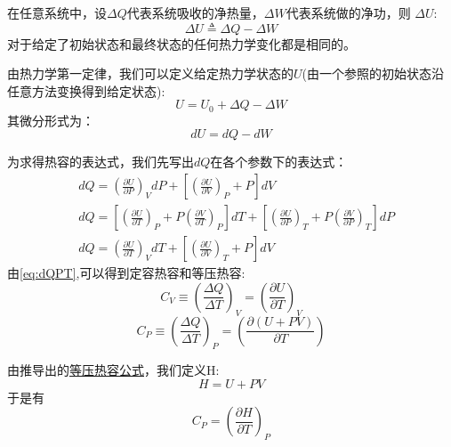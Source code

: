 \documentclass[12pt, a4paper, oneside]{ctexbook}
\newcommand{\hl}[1]{\hlbox{#1}}
\newcommand{\optxt}[1]{\textcolor{opcol}{#1}}
\newcommand{\tit}[1]{\begin{center}
          \large\hl{#1}
        \end{center}}
\newcounter{#2}
\newcounter{#2}[#1]
\numberwithin{#2}{#1}
\begin{document}
          \begin{law}
            \tit{热力学第一定律}
            在任意系统中，设$\Delta Q$代表系统吸收的净热量，\(\Delta W\)代表系统做的净功，则 \(\Delta U\):
            \begin{equation}
              \Delta U\triangleq \Delta Q-\Delta W
            \end{equation}
            对于给定了初始状态和最终状态的任何热力学变化都是相同的。
          \end{law}
          \begin{define}
            由热力学第一定律，我们可以定义给定热力学状态的\hl{内能}\(U\)(\optxt{由一个参照的初始状态沿任意方法变换得到给定状态}):
            \begin{equation*}
              U=U_0+\Delta Q-\Delta W
            \end{equation*}
            其\optxt{微分形式}为：
            \begin{equation}
              dU=dQ-dW
            \end{equation}
          \end{define}
          \begin{deduce}
            \label{ded:dQ}
            为求得热容的表达式，我们先写出\(dQ\)在各个参数下的表达式：
            \begin{align}
              \label{eq:dQPV}&d Q=\left(\frac{\partial U}{\partial P}\right)_V d P+\left[\left(\frac{\partial U}{\partial V}\right)_P+P\right] d V \\
              \label{eq:dQPT}&d Q=\left[\left(\frac{\partial U}{\partial T}\right)_P+P\left(\frac{\partial V}{\partial T}\right)_P\right] d T+\left[\left(\frac{\partial U}{\partial P}\right)_T+P\left(\frac{\partial V}{\partial P}\right)_T\right] d P \\
              \label{eq:dQVT}&d Q=\left(\frac{\partial U}{\partial T}\right)_V d T+\left[\left(\frac{\partial U}{\partial V}\right)_T+P\right] d V
              \end{align}
              由\autoref{eq:dQPT},可以得到定容热容和等压热容:
              \begin{equation}
                C_V\equiv \left(\frac{\Delta Q}{\Delta T}\right)_V=\left(\frac{\partial U}{\partial T}\right)_V
              \end{equation}
              \begin{equation}
                C_P\equiv \left(\frac{\Delta Q}{\Delta T}\right)_P=\left(\frac{\partial (U+PV)}{\partial T}\right)
              \end{equation}
          \end{deduce}
          \begin{define}
            由推导出的\hyperref[ded:dQ]{等压热容公式}，我们定义\hl{焓}H:
            \begin{equation}
              H=U+PV
            \end{equation}
            于是有
            \begin{equation}
              C_P=\left(\frac{\partial H}{\partial T}\right)_P
            \end{equation}
          \end{define}
\end{document}
